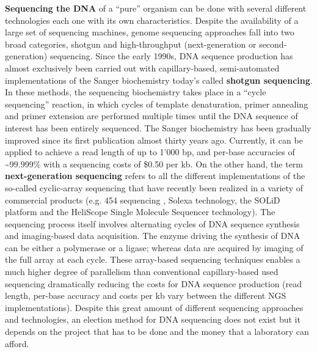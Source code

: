\textbf{Sequencing the DNA} of a ``pure'' organism can be done with several different technologies each one with its own characteristics. Despite the availability of a large set of sequencing machines, genome sequencing approaches fall into two broad categories, shotgun and high-throughput (next-generation or second-generation) sequencing. Since the early 1990s, DNA sequence production has almost exclusively been carried out with capillary-based, semi-automated implementations of the Sanger biochemistry today's called \textbf{shotgun sequencing}. In these methods, the sequencing biochemistry takes place in a ``cycle sequencing'' reaction, in which cycles of template denaturation, primer annealing and primer extension are performed multiple times until the DNA sequence of interest has been entirely sequenced. The Sanger biochemistry has been gradually improved since its first publication almost thirty years ago. Currently, it can be applied to achieve a read length of up to 1'000 bp, and per-base accuracies of \textasciitilde99.999\% with a sequencing costs of \$0.50 per kb. On the other hand, the term \textbf{next-generation sequencing} refers to all the different implementations of the so-called cyclic-array sequencing \cite{margulies2005genome} that have recently been realized in a variety of commercial products (e.g. 454 sequencing , Solexa technology, the SOLiD platform and the HeliScope Single Molecule Sequencer technology). The sequencing process itself involves alternating cycles of DNA sequence synthesis and imaging-based data acquisition. The enzyme driving the synthesis of DNA can be either a polymerase or a ligase; whereas data are acquired by imaging of the full array at each cycle. These array-based sequencing techniques enables a much higher degree of parallelism than conventional capillary-based used sequencing dramatically reducing the costs for DNA sequence production (read length, per-base accuracy and costs per kb vary between the different NGS implementations). Despite this great amount of different sequencing approaches and technologies, an election method for DNA sequencing does not exist but it depends on the project that has to be done and the money that a laboratory can afford.\\
